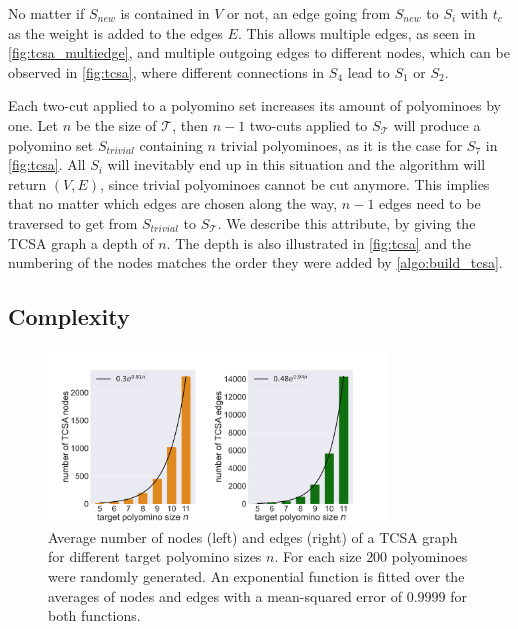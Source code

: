 No matter if $S_\textit{new}$ is contained in $V$ or not, an edge going from $S_\textit{new}$ to $S_i$ with $t_c$ as the weight is added to the edges $E$.
This allows multiple edges, as seen in \autoref{fig:tcsa_multiedge}, and multiple outgoing edges to different nodes, which can be observed in \autoref{fig:tcsa}, where different connections in $S_4$ lead to $S_1$ or $S_2$.

Each two-cut applied to a polyomino set increases its amount of polyominoes by one.
Let $n$ be the size of $\mathcal{T}$, then $n-1$ two-cuts applied to $S_\mathcal{T}$ will produce a polyomino set $S_\textit{trivial}$ containing $n$ trivial polyominoes, as it is the case for $S_7$ in \autoref{fig:tcsa}.
All $S_i$ will inevitably end up in this situation and the algorithm will return $(V,E)$, since trivial polyominoes cannot be cut anymore.
This implies that no matter which edges are chosen along the way, $n-1$ edges need to be traversed to get from $S_\textit{trivial}$ to $S_\mathcal{T}$.
We describe this attribute, by giving the TCSA graph a depth of $n$.
The depth is also illustrated in \autoref{fig:tcsa} and the numbering of the nodes matches the order they were added by \autoref{algo:build_tcsa}.

\subsection{Complexity}

\begin{figure}
	\centering
	\includegraphics[width=0.8\textwidth]{figures/plots/tcsa_nodes_edges.pdf}
	\caption[Average two-cut-sub-assembly nodes and edges for target size $n$]{Average number of nodes (left) and edges (right) of a TCSA graph for different target polyomino sizes $n$. For each size $200$ polyominoes were randomly generated. An exponential function is fitted over the averages of nodes and edges with a mean-squared error of $0.9999$ for both functions.}
	\label{fig:tcsa_plot}
\end{figure}

